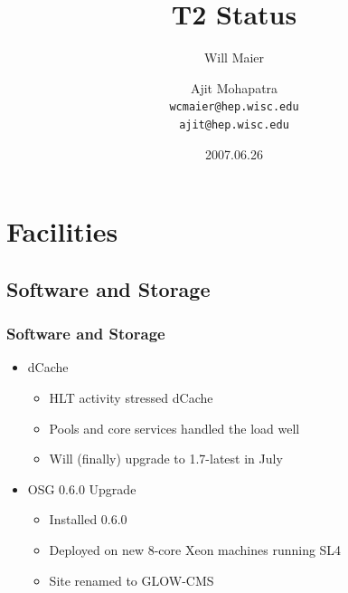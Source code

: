 \documentclass{beamer}
\title{T2 Status}
\author[Maier, Mohapatra]{
    Will Maier \and Ajit Mohapatra\\ 
    {\tt wcmaier@hep.wisc.edu}\\
    {\tt ajit@hep.wisc.edu}}
\institute[Wisconsin]{University of Wisconsin - High Energy Physics}
\date{2007.06.26}
\begin{document}
\begin{frame}
    \titlepage
\end{frame}

\section{Facilities}
\subsection{Software and Storage}
\begin{frame}
    \frametitle{Software and Storage}
    \begin{itemize}
        \item dCache
        \begin{itemize}
            \item HLT activity stressed dCache
            \item Pools and core services handled the load well
            \item Will (finally) upgrade to 1.7-latest in July
        \end{itemize}
        \item OSG 0.6.0 Upgrade
        \begin{itemize}
            \item Installed 0.6.0
            \item Deployed on new 8-core Xeon machines running SL4
            \item Site renamed to GLOW-CMS
        \end{itemize}
    \end{itemize}
\end{frame}
\end{document}

